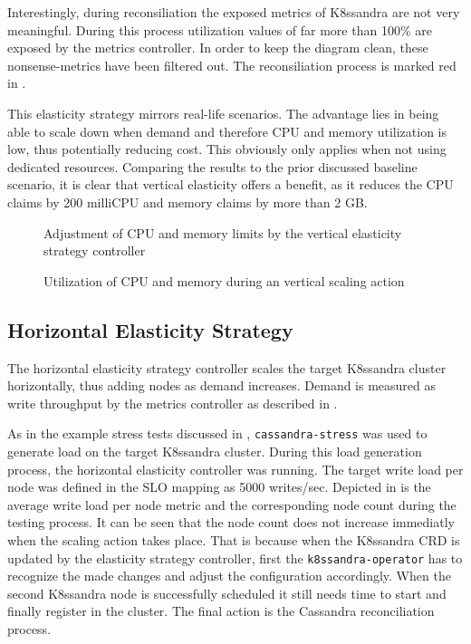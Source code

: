 Interestingly, during reconsiliation the exposed metrics of K8ssandra are not very meaningful. During this process utilization values of far more than 100\% are exposed by the metrics controller. In order to keep the diagram clean, these nonsense-metrics have been filtered out. The reconsiliation process is marked red in .

This elasticity strategy mirrors real-life scenarios. The advantage lies in being able to scale down when demand and therefore CPU and memory utilization is low, thus potentially reducing cost. This obviously only applies when not using dedicated resources. Comparing the results to the prior discussed baseline scenario, it is clear that vertical elasticity offers a benefit, as it reduces the CPU claims by 200 milliCPU and memory claims by more than 2 GB. 
\begin{figure}
    \centering
    
    \caption{Adjustment of CPU and memory limits by the vertical elasticity strategy controller}
    \label{fig:simple-limits-vertical}
\end{figure}

\begin{figure}
    \centering
    
    \caption{Utilization of CPU and memory during an vertical scaling action}
    \label{fig:utilization-vertical}
\end{figure}

\subsection{Horizontal Elasticity Strategy}
\label{sec:evaluation-horizontal-elasticity}

The horizontal elasticity strategy controller scales the target K8ssandra cluster horizontally, thus adding nodes as demand increases. Demand is measured as write throughput by the metrics controller as described in .

As in the example stress tests discussed in , \texttt{cassandra-stress} was used to generate load on the target K8ssandra cluster. During this load generation process, the horizontal elasticity controller was running. The target write load per node was defined in the SLO mapping as 5000 writes/sec. Depicted in  is the average write load per node metric and the corresponding node count during the testing process. It can be seen that the node count does not increase immediatly when the scaling action takes place. That is because when the K8ssandra CRD is updated by the elasticity strategy controller, first the \texttt{k8ssandra-operator} has to recognize the made changes and adjust the configuration accordingly. When the second K8ssandra node is successfully scheduled it still needs time to start and finally register in the cluster. The final action is the Cassandra reconciliation process.

